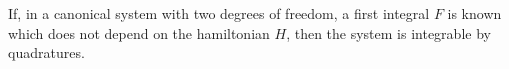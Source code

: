If, in a canonical system with two degrees of freedom, a first integral $F$ is known which does not depend on the hamiltonian $H$, then the system is integrable by quadratures.
